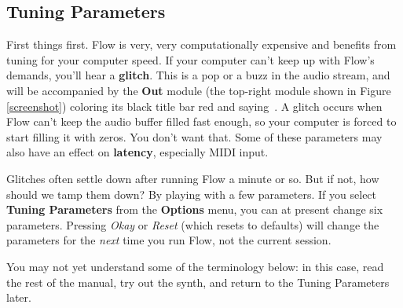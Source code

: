 \documentclass{article}
\newcommand\name{Flow}
\begin{document}
\subsection{Tuning Parameters}
First things first.  {\name} is very, very computationally expensive and benefits from tuning for your computer speed.  If your computer can't keep up with Flow's demands, you'll hear a {\bf glitch}.  This is a pop or a buzz in the audio stream, and will be accompanied by the {\bf Out} module (the top-right module shown in Figure \ref{screenshot}) coloring its black title bar red and saying \,.  A glitch occurs when Flow can't keep the audio buffer filled fast enough, so your computer is forced to start filling it with zeros.  You don't want that.  Some of these parameters may also have an effect on {\bf latency}, especially MIDI input.

Glitches often settle down after running Flow a minute or so.  But if not, how should we tamp them down?  By playing with a few parameters. If you select {\bf Tuning Parameters} from the {\bf Options} menu, you can at present change six parameters.  Pressing {\it Okay} or {\it Reset} (which resets to defaults) will change the parameters for the {\it next} time you run {\name}, not the current session.   

You may not yet understand some of the terminology below: in this case, read the rest of the manual, try out the synth, and return to the Tuning Parameters later.
\end{document}
